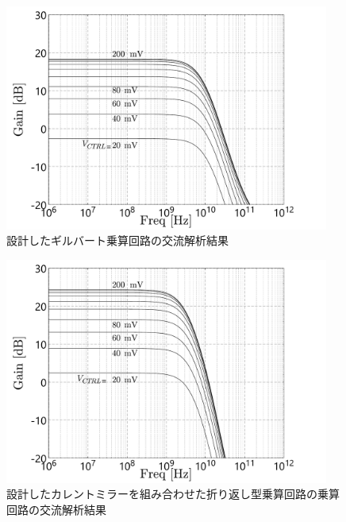         \begin{figure}[!b]
            \centering
            \includegraphics[width=0.95\textwidth]{figures/chapter3/previous_ac_com.pdf}
            \caption{設計したギルバート乗算回路の交流解析結果}
            \label{fig:3_previous_ac_com}
        \end{figure}
        \begin{figure}[!b]
            \centering
            \includegraphics[width=0.95\textwidth]{figures/chapter3/folded_mirror_ac_com.pdf}
            \caption{設計したカレントミラーを組み合わせた折り返し型乗算回路の乗算回路の交流解析結果}
            \label{fig:3_folded_mirror_ac_com}
        \end{figure}

        


